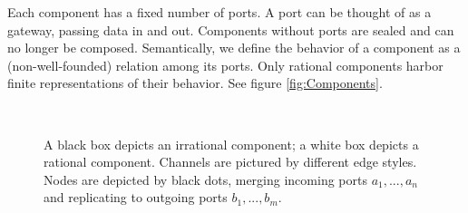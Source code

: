 Each component has a fixed number of ports.
A port can be thought of as a gateway, passing data in and out.
Components without ports are sealed and can no longer be composed.
Semantically, we define the behavior of a component as a (non-well-founded) relation among its ports.
Only rational components harbor finite representations of their behavior.
See figure \ref{fig:Components}.
\begin{figure}[t]
\begin{centering}
$\qquad$$\qquad$
\par\end{centering}
\caption{
	A black box depicts an irrational component;
	a white box depicts a rational component.
	Channels are pictured by different edge styles.
	Nodes are depicted by black dots, merging incoming ports $a_1,...,a_n$ and replicating to outgoing ports $b_1,...,b_m$.}
\end{figure}

